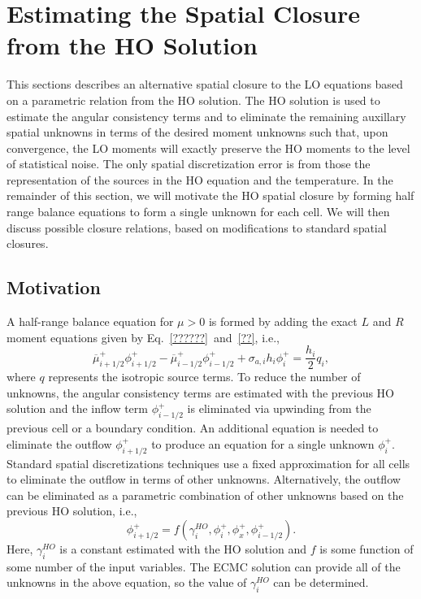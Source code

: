 
\section{Estimating the Spatial Closure from the HO Solution}
\label{sec:spat_clos}

This sections describes an alternative spatial closure to the LO equations based on 
a parametric relation from the HO solution. 
  The HO solution is used to estimate the angular consistency terms and to eliminate the
  remaining auxillary spatial unknowns in terms of the desired moment unknowns such that,
  upon convergence, the LO moments will exactly preserve the HO moments to the level of
  statistical noise.  The only spatial discretization
error is from those the representation of the sources in the HO equation and the
temperature.
In the remainder of this section, we will motivate the HO spatial closure by forming half
range balance equations to form a single unknown for each cell.  We will then discuss
possible closure relations, based on modifications to standard spatial closures.

\subsection{Motivation}

A half-range balance equation for $\mu>0$ is formed by adding the
exact $L$ and
$R$ moment equations given by Eq.~\eqref{??????}~and~\eqref{??}, i.e.,
\begin{equation}\label{eq:hr_bal}
    \overline\mu^+_{i+1/2}\phi_{i+1/2}^+ - \overline\mu^+_{i-1/2}\phi_{i-1/2}^+ +
    {\sigma_{a,i}h_i} \phi_i^+ = \frac{h_i}{2} q_i,
\end{equation}
where $q$ represents the isotropic source terms.  To reduce the number of unknowns, the
angular consistency terms are estimated
with the previous HO solution and the inflow term $\phi_{i-1/2}^+$ is eliminated via upwinding from the previous
cell or a boundary condition.  An additional equation is needed to eliminate the outflow $\phi_{i+1/2}^+$ to produce an
equation for a single unknown $\phi_{i}^+$.  Standard spatial discretizations techniques
use a fixed approximation for all cells to eliminate the outflow in terms of other
unknowns.  Alternatively, the outflow can be eliminated as a parametric
combination of other unknowns based on the previous HO solution, i.e.,
\begin{equation}
    \phi_{i+1/2}^+ = f(\gamma^{HO}_i, \phi_i^+, \phi_x^+, \phi_{i-1/2}^+).
\end{equation}
Here, $\gamma^{HO}_i$ is a constant estimated with the HO solution and $f$ is some
function of some number of the input
variables.  The ECMC solution can provide all of the unknowns in the above equation, so
the value of $\gamma^{HO}_i$ can be determined.

